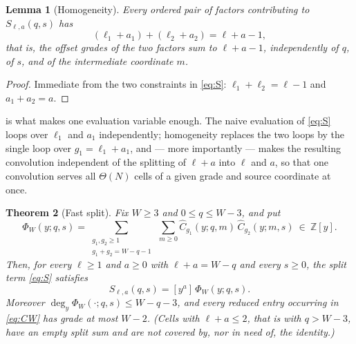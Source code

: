 \documentclass[11pt,reqno]{amsart}
\newtheorem{theorem}{Theorem}[section]
\newtheorem{lemma}[theorem]{Lemma}
\theoremstyle{definition}
\theoremstyle{remark}
\newcommand{\Chat}{\widehat C}
\begin{document}
\begin{lemma}[Homogeneity]\label{lem:homogeneity}
Every ordered pair of factors contributing to $S_{\ell,a}(q,s)$ has
\begin{equation}\label{eq:homog}
 (\ell_1+a_1)+(\ell_2+a_2)=\ell+a-1,
\end{equation}
that is, the offset grades of the two factors sum to $\ell+a-1$,
independently of $q$, of $s$, and of the intermediate coordinate $m$.
\end{lemma}

\begin{proof}
Immediate from the two constraints in \eqref{eq:S}: $\ell_1+\ell_2=\ell-1$
and $a_1+a_2=a$.
\end{proof}

 is what makes one evaluation variable enough.  The
naive evaluation of \eqref{eq:S} loops over $\ell_1$ and $a_1$
independently; homogeneity replaces the two loops by the single loop over
$g_1=\ell_1+a_1$, and --- more importantly --- makes the resulting
convolution independent of the splitting of $\ell+a$ into $\ell$ and $a$,
so that one convolution serves all $\Theta(N)$ cells of a given grade and
source coordinate at once.

\begin{theorem}[Fast split]\label{thm:fast-split}
Fix $W\geq3$ and $0\leq q\leq W-3$, and put
\begin{equation}\label{eq:CW}
 \Phi_W(y;q,s)=\sum_{\substack{g_1,g_2\geq1\\ g_1+g_2=W-q-1}}\ \sum_{m\geq0}
 \Chat_{g_1}(y;q,m)\,\Chat_{g_2}(y;m,s)\ \in\ \mathbb Z[y].
\end{equation}
Then, for every $\ell\geq1$ and $a\geq0$ with $\ell+a=W-q$ and every
$s\geq0$, the split term \eqref{eq:S} satisfies
\begin{equation}\label{eq:fast-split}
 S_{\ell,a}(q,s)=[y^a]\,\Phi_W(y;q,s).
\end{equation}
Moreover $\deg_y\Phi_W(\cdot;q,s)\leq W-q-3$, and every reduced entry occurring
in \eqref{eq:CW} has grade at most $W-2$.  (Cells with $\ell+a\leq2$, that
is with $q>W-3$, have an empty split sum and are not covered by, nor in need
of, the identity.)
\end{theorem}
\end{document}
